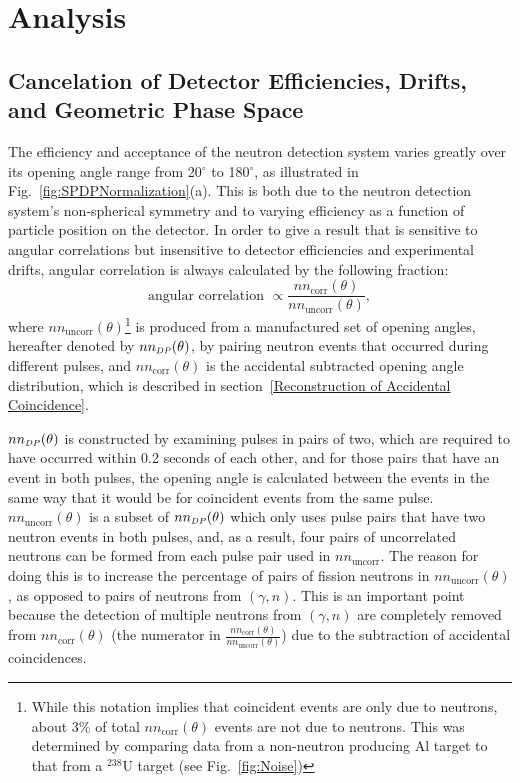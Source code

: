 \section{Analysis}
\label{Analysis}

\subsection{Cancelation of Detector Efficiencies, Drifts, and Geometric Phase Space}
\label{subsec:SPDPCancelation}
The efficiency and acceptance of the neutron detection system varies greatly over its opening angle range from 20$^{\circ}$ to 180$^{\circ}$, as illustrated in Fig.~\ref{fig:SPDPNormalization}(a).
This is both due to the neutron detection system's non-spherical symmetry and to varying efficiency as a function of particle position on the detector.
In order to give a result that is sensitive to angular correlations but insensitive to detector efficiencies and experimental drifts, angular correlation is always calculated by the following fraction:
\begin{displaymath}
\text{angular correlation }  \propto \frac{nn_{\text{corr}}(\theta)}{nn_{\text{uncorr}}(\theta)},
\end{displaymath}
 where $nn_{\text{uncorr}}(\theta)$\footnote{While this notation implies that coincident events are only due to neutrons, about 3\% of total  $nn_{\text{corr}}(\theta)$ events are not due to neutrons. This was determined by comparing data from a non-neutron producing Al target to that from a $^{238}$U target (see Fig.~\ref{fig:Noise})} is produced from a manufactured set of opening angles, hereafter denoted by $nn_{\scaleto{DP}{4pt}}(\theta)$, by pairing neutron events that occurred during different pulses, and $nn_{\text{corr}}(\theta)$ is the accidental subtracted opening angle distribution, which is described in section~\ref{Reconstruction of Accidental Coincidence}.

$nn_{\scaleto{DP}{4pt}}(\theta)$ is constructed by examining pulses in pairs of two, which are required to have occurred within 0.2 seconds of each other, and for those pairs that have an event in both pulses, the opening angle is calculated between the events in the same way that it would be for coincident events from the same pulse.
$nn_{\text{uncorr}}(\theta)$ is a subset of $nn_{\scaleto{DP}{4pt}}(\theta)$ which only uses pulse pairs that have two neutron events in both pulses, and, as a result, four pairs of uncorrelated neutrons can be formed from each pulse pair used in $nn_{\text{uncorr}}$. 
The reason for doing this is to increase the percentage of pairs of fission neutrons in $nn_{\text{uncorr}}(\theta)$, as opposed to pairs of neutrons from $(\gamma,n)$.
This is an important point because the detection of multiple neutrons from $(\gamma,n)$ are completely removed from $nn_{\text{corr}}(\theta)$ (the numerator in $\frac{nn_{\text{corr}}(\theta)}{nn_{\text{uncorr}}(\theta)}$) due to the subtraction of accidental coincidences.

